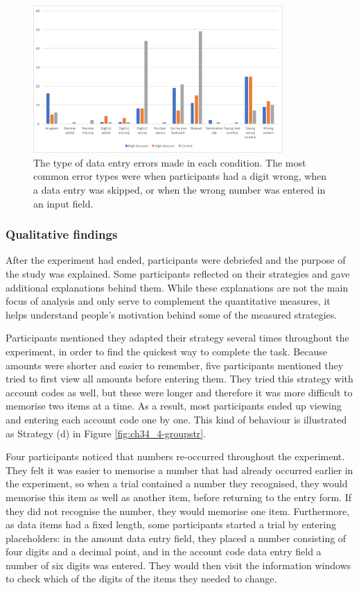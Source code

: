 \begin{figure}
\includegraphics[width=0.85\textwidth]{images/ch34/ch34-4_TypeofErrors.pdf}
    \caption[Study 4 type of data entry errors]{The type of data entry errors made in each condition. The most common error types were when participants had a digit wrong, when a data entry was skipped, or when the wrong number was entered in an input field.}\label{fig:ch34_4-typeoferrors}
\end{figure}

\subsubsection{Qualitative findings}
After the experiment had ended, participants were debriefed and the purpose of the study was explained. Some participants reflected on their strategies and gave additional explanations behind them. While these explanations are not the main focus of analysis and only serve to complement the quantitative measures, it helps understand people's motivation behind some of the measured strategies.

Participants mentioned they adapted their strategy several times throughout the experiment, in order to find the quickest way to complete the task. Because amounts were shorter and easier to remember, five participants mentioned they tried to first view all amounts before entering them. They tried this strategy with account codes as well, but these were longer and therefore it was more difficult to memorise two items at a time. As a result, most participants ended up viewing and entering each account code one by one. This kind of behaviour is illustrated as Strategy (d) in Figure \ref{fig:ch34_4-groupstr}.

Four participants noticed that numbers re-occurred throughout the experiment. They felt it was easier to memorise a number that had already occurred earlier in the experiment, so when a trial contained a number they recognised, they would memorise this item as well as another item, before returning to the entry form. If they did not recognise the number, they would memorise one item. Furthermore, as data items had a fixed length, some participants started a trial by entering placeholders: in the amount data entry field, they placed a number consisting of four digits and a decimal point, and in the account code data entry field a number of six digits was entered. They would then visit the information windows to check which of the digits of the items they needed to change. 

